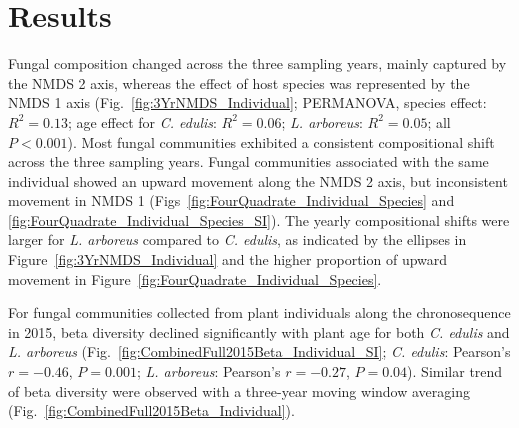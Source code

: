 \section{Results}
Fungal composition changed across the three sampling years, mainly captured by the NMDS 2 axis, whereas the effect of host species was represented by the NMDS 1 axis (Fig.~\ref{fig:3YrNMDS_Individual}; PERMANOVA, species effect: $R^{2}=0.13$; age effect for \textit{C. edulis}: $R^{2}=0.06$; \textit{L. arboreus}: $R^{2}=0.05$; all $P<0.001$).  
Most fungal communities exhibited a consistent compositional shift across the three sampling years. Fungal communities associated with the same individual showed an upward movement along the NMDS 2 axis, but inconsistent movement in NMDS 1 (Figs~\ref{fig:FourQuadrate_Individual_Species} and \ref{fig:FourQuadrate_Individual_Species_SI}).
The yearly compositional shifts were larger for \textit{L. arboreus} compared to \textit{C. edulis}, as indicated by the ellipses in Figure~\ref{fig:3YrNMDS_Individual} and the higher proportion of upward movement in Figure~\ref{fig:FourQuadrate_Individual_Species}.
\par


For fungal communities collected from plant individuals along the chronosequence in 2015, beta diversity declined significantly with plant age for both \textit{C. edulis} and \textit{L. arboreus} (Fig.~\ref{fig:CombinedFull2015Beta_Individual_SI}; \textit{C. edulis}: Pearson's $r=-0.46$, $P=0.001$; \textit{L. arboreus}:  Pearson's $r=-0.27$, $P=0.04$). Similar trend of beta diversity were observed with a three-year moving window averaging (Fig.~\ref{fig:CombinedFull2015Beta_Individual}).
\par


